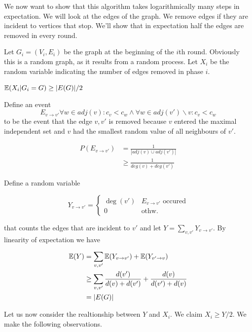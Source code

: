We now want to show that this algorithm takes logarithmically many steps in expectation. We will look at the edges of the graph. We remove edges if they are incident to vertices that stop. We'll show that in expectation half the edges are removed in every round. 

Let $G_i=(V_i,E_i)$ be the graph at the beginning of the $i$th round. Obviously this is a random graph, as it results from a random process. Let $X_i$ be the random variable indicating the number of edges removed in phase $i$.

\begin{lem} \label{lem:at_least_half}$\mathbb{E}(X_i |G_i = G) \geq |E(G)|/2$ \end{lem}

\begin{pr} Define an event
\[E_{v\rightarrow v'} \forall w\in adj(v): c_v<c_w \wedge \forall w\in adj(v') \backslash {v} : c_v < c_w\]
to be the event that the edge ${v,v'}$ is removed because $v$ entered the maximal independent set and $v$ had the smallest random value of all neighbours of $v'$.

\begin{align*}
P(E_{v\rightarrow v'}) &= \frac{1}{| adj(v) \cup adj(v') |}\\
	&\geq \frac{1}{deg(v) + deg(v')}	
\end{align*}

Define a random variable 

\[Y_{v\rightarrow v'} = \begin{cases} \deg(v') & E_{v\rightarrow v'} \text{ occured} \\ 0 & \text{othw.}\end{cases}\]

that counts the edges that are incident to $v'$ and let $Y=\sum_{v,v'} Y_{v\rightarrow v'}$. By linearity of expectation we have

\begin{align*}
\mathbb{E}(Y) &= \sum_{v,v'} \mathbb{E}(Y_{v\rightarrow v'}) + \mathbb{E}(Y_{v'\rightarrow v}) \\
	&\geq \sum_{v,v'} \frac{d(v')}{d(v)+d(v')} + \frac{d(v)}{d(v')+d(v)}\\
	&= |E(G)|
\end{align*}

Let us now consider the realtionship between $Y$ and $X_i$. We claim $X_i \geq Y/2$. We make the following observations.


\end{pr}
